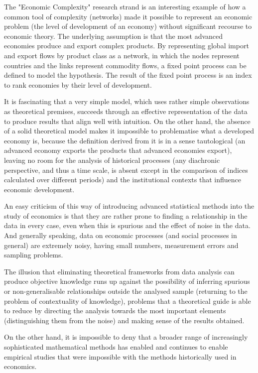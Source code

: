 \documentclass[a4paper, headings=standardclasses]{scrartcl}
\begin{document}
The "Economic Complexity" research strand \parencite{hidalgo2021} is an interesting example of how a common tool of complexity (networks) made it possible to represent an economic problem (the level of development of an economy) without significant recourse to economic theory.
The underlying assumption is that the most advanced economies produce and export complex products.
By representing global import and export flows by product class as a network, in which the nodes represent countries and the links represent commodity flows, a fixed point process can be defined to model the hypothesis.
The result of the fixed point process is an index to rank economies by their level of development.

It is fascinating that a very simple model, which uses rather simple observations as theoretical premises, succeeds through an effective representation of the data to produce results that align well with intuition.
On the other hand, the absence of a solid theoretical model makes it impossible to problematise what a developed economy is, because the definition derived from it is in a sense tautological (an advanced economy exports the products that advanced economies export), leaving no room for the analysis of historical processes (any diachronic perspective, and thus a time scale, is absent except in the comparison of indices calculated over different periods) and the institutional contexts that influence economic development.

An easy criticism of this way of introducing advanced statistical methods into the study of economics is that they are rather prone to finding a relationship in the data in every case, even when this is spurious and the effect of noise in the data. And generally speaking, data on economic processes (and social processes in general) are extremely noisy, having small numbers, measurement errors and sampling problems.

The illusion that eliminating theoretical frameworks from data analysis can produce objective knowledge runs up against the possibility of inferring spurious or non-generalisable relationships outside the analysed sample (returning to the problem of contextuality of knowledge), problems that a theoretical guide is able to reduce by directing the analysis towards the most important elements (distinguishing them from the noise) and making sense of the results obtained.

On the other hand, it is impossible to deny that a broader range of increasingly sophisticated mathematical methods has enabled and continues to enable empirical studies that were impossible with the methods historically used in economics.
\end{document}
